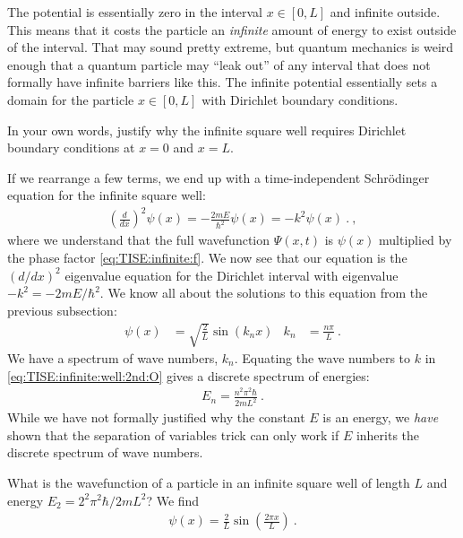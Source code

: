 The potential is essentially zero in the interval $x\in[0,L]$ and infinite outside. This means that it costs the particle an \emph{infinite} amount of energy to exist outside of the interval. That may sound pretty extreme, but quantum mechanics is weird enough that a quantum particle may ``leak out'' of any interval that does not formally have infinite barriers like this. The infinite potential essentially sets a domain for the particle $x\in[0,L]$ with Dirichlet boundary conditions. 
\begin{exercise}
In your own words, justify why the infinite square well requires Dirichlet boundary conditions at $x=0$ and $x=L$.
\end{exercise}

If we rearrange a few terms, we end up with a time-independent Schr\"odinger equation for the infinite square well:
\begin{align}
    \left(\frac{d}{dx}\right)^2 \psi(x) = -\frac{2mE}{\hbar^2}\psi(x) 
    = - k^2 \psi(x) \ .
    \ ,
    \label{eq:TISE:infinite:well:2nd:O}
\end{align}
where we understand that the full wavefunction $\Psi(x,t)$ is $\psi(x)$ multiplied by the phase factor \eqref{eq:TISE:infinite:f}. We now see that our equation is the $(d/dx)^2$ eigenvalue equation for the Dirichlet interval with eigenvalue $-k^2 = -2mE/\hbar^2$. We know all about the solutions to this equation from the previous subsection:
\begin{align}
    \psi(x) &= \sqrt{\frac{2}{L}} \sin(k_n x)
    &
    k_n &= \frac{n\pi}{L} \ .
\end{align}
We have a spectrum of wave numbers, $k_n$. Equating the wave numbers to $k$ in \eqref{eq:TISE:infinite:well:2nd:O} gives a discrete spectrum of energies:
\begin{align}
    E_n = \frac{n^2 \pi^2 \hbar}{2mL^2} \ .
\end{align}
While we have not formally justified why the constant $E$ is an energy, we \emph{have} shown that the separation of variables trick can only work if $E$ inherits the discrete spectrum of wave numbers. 

\begin{example} What is the wavefunction of a particle in an infinite square well of length $L$ and energy $E_2 =  2^2 \pi^2 \hbar / 2mL^2$? We find
\begin{align}
    \psi(x) = \frac{2}{L} \sin\left(\frac{2\pi x}{L}\right) \ .
\end{align}

\end{example}



